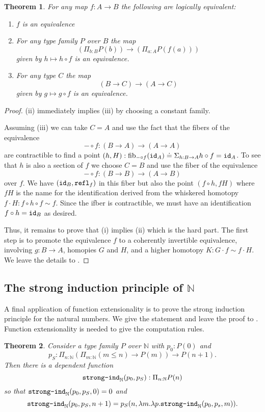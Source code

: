 \documentclass{amsart}
\theoremstyle{theorem}
\newtheorem*{thm}{Theorem}
\theoremstyle{definition}
\theoremstyle{remark}
\newcommand{\0}{\mathbbe{0}}
\newcommand{\1}{\mathbbe{1}}
\newcommand{\2}{\mathbbe{2}}
\newcommand{\3}{\mathbbe{3}}
\newcommand{\4}{\mathbbe{4}}
\newcommand{\term}[1]{{\textup{\texttt{#1}}}}
\newcommand{\type}[1]{{\textup{#1}}}
\newcommand{\id}{\term{id}}
\newcommand{\bN}{{\mathbb{N}}}
\newcommand{\refl}{\term{refl}}
\newcommand{\fib}{\type{fib}}
\begin{document}
\begin{thm} For any map $f \colon A \to B$ the following are logically equivalent:
\begin{enumerate}
\item $f$ is an equivalence
\item For any type family $P$ over $B$ the map
\[ \left( \Pi_{b:B} P(b) \right) \to \left( \Pi_{a:A} P(f(a))\right)\]
given by $h \mapsto h \circ f$ is an equivalence.
\item For any type $C$ the map
\[ (B \to C) \to (A \to C)\]
given by $g \mapsto g \circ f$ is an equivalence.
\end{enumerate}
\end{thm}
\begin{proof}
(ii) immediately implies (iii) by choosing a constant family. 

Assuming (iii) we can take $C=A$ and use the fact that the fibers of the equivalence
\[ - \circ f : (B \to A) \to (A \to A)\]
are contractible to find a point $(h, H) : \fib_{-\circ f}(\id_A) \doteq \Sigma_{h:B \to A} h \circ f = \id_A$.
To see that $h$ is also a section of $f$ we choose $C=B$ and use the fiber of the equivalence
\[ -\circ f : (B \to B) \to (A \to B)\]
over $f$. We have $(\id_B,\refl_f)$ in this fiber but also the point $(f \circ h, fH)$ where $fH$ is the name for the identification derived from the whiskered homotopy $f \cdot H : f \circ h \circ f \sim f$. Since the ifber is contractible, we must have an identification $f \circ h = \id_B$ as desired.

Thus, it remains to prove that (i) implies (ii) which is the hard part. The first step is to promote the equivalence $f$ to a coherently invertible equivalence, involving $g : B \to A$, homopies $G$ and $H$, and a higher homotopy $K : G \cdot f \sim f \cdot H$. We leave the details to \cite[13.4.1]{Rijke}.
\end{proof}

\subsection*{The strong induction principle of \texorpdfstring{$\bN$}{the natural numbers}}

A final application of function extensionality is to prove the strong induction principle for the natural numbers. We give the statement and leave the proof to \cite[\S13.5]{Rijke}. Function extensionality is needed to give the computation rules.

\begin{thm} Consider a type family $P$ over $\bN$ with $p_0 : P(0)$ and
\[ p_S : \Pi_{n: \bN} \left( \Pi_{m: \bN}(m \leq n) \to P(m)\right) \to P(n+1).\]
Then there is a dependent function
\[ \term{strong-ind}_\bN(p_0,p_S) : \Pi_{n : \bN}P(n) \]
so that $\term{strong-ind}_\bN(p_0,p_S,0)  = 0$ and 
\[ \term{strong-ind}_\bN(p_0,p_S, n+1) = p_S(n, \lambda m.\lambda p.\term{strong-ind}_\bN(p_0,p_s,m)).\]
\end{thm}
\end{document}
